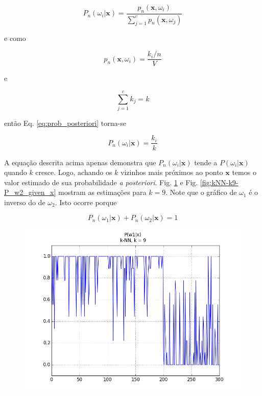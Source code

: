 \documentclass[12pt,twoside]{report}
\newcommand{\figureref}[1]{Fig. \ref{fig:#1}}
\newcommand{\equationref}[1]{Eq. \ref{eq:#1}}
\begin{document}
\begin{equation}
P_n(\omega_i|\mathbf{x}) = \frac{p_n(\mathbf{x}, \omega_i)}{\sum_{j=1}^c p_n(\mathbf{x}, \omega_j)}
\label{eq:prob_posteriori}
\end{equation}

\noindent e como

\begin{equation}
p_n(\mathbf{x}, \omega_i) = \frac{k_i / n}{V}
\label{eq:dens_prob_conjunta}
\end{equation}

e

\begin{equation}
\sum_{j=1}^c k_j = k
\label{eq:sum_k_i}
\end{equation}

\noindent então \equationref{prob_posteriori} torna-se

\begin{equation}
P_n(\omega_i|\mathbf{x}) = \frac{k_i}{k}
\label{eq:prob_posteriori_2}
\end{equation}

A equação descrita acima apenas demonstra que $P_n(\omega_i|\mathbf{x})$ tende a
$P(\omega_i|\mathbf{x})$ quando $k$ cresce. Logo, achando os $k$ vizinhos mais
próximos ao ponto $\mathbf{x}$ temos o valor estimado de sua probabilidade
\emph{a posteriori}. \figureref{kNN-k9-P_w1_given_x} e \figureref{kNN-k9-P_w2_given_x}
mostram as estimações para $k = 9$. Note que o gráfico de $\omega_1$ é o inverso
do de $\omega_2$. Isto ocorre porque

\begin{equation}
P_n(\omega_1|\mathbf{x}) + P_n(\omega_2|\mathbf{x}) = 1
\label{eq:sum_prob_posteriori}
\end{equation}

\begin{figure}[ht]
    \centering
    \includegraphics[scale=0.5]{kNN-k9-P_w1_given_x}
    \caption{}
    \label{fig:kNN-k9-P_w1_given_x}
\end{figure}
\end{document}
